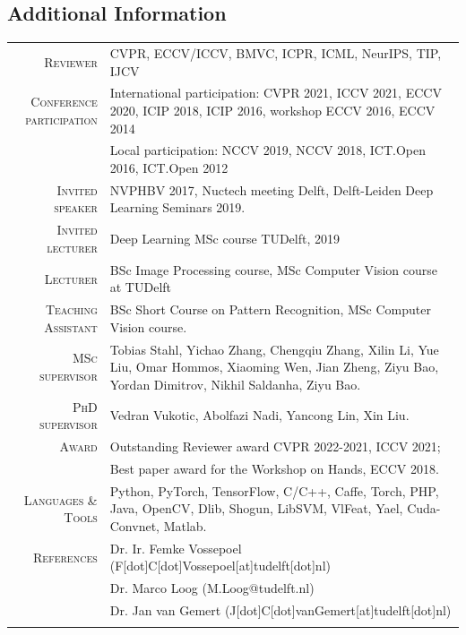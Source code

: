\documentclass[a4paper, oneside, final]{scrartcl}
\begin{document}
\begin{center}
		\section{Additional Information}
		\begin{tabular}{r@{\hskip 0.3in}p{11.3cm}}
            \textsc{Reviewer}                   & CVPR, ECCV/ICCV, BMVC, ICPR, ICML, NeurIPS, TIP, IJCV\\
            \textsc{Conference participation}   & International participation: CVPR 2021, ICCV 2021, ECCV 2020, ICIP 2018, ICIP 2016, workshop ECCV 2016, ECCV 2014\\
                                                & Local participation: NCCV 2019, NCCV 2018, ICT.Open 2016, ICT.Open 2012\\
            \textsc{Invited speaker}            & NVPHBV 2017, Nuctech meeting Delft, Delft-Leiden Deep Learning Seminars 2019.\\
            \textsc{Invited lecturer}           & Deep Learning MSc course TUDelft, 2019\\
			\textsc{Lecturer}		            & BSc Image Processing course, MSc Computer Vision course at TUDelft\\
            \textsc{Teaching Assistant}         & BSc Short Course on Pattern Recognition, MSc Computer Vision course.\\ 
			\textsc{MSc supervisor}             & Tobias Stahl, Yichao Zhang, Chengqiu Zhang, Xilin Li, Yue Liu, Omar Hommos, Xiaoming Wen, Jian Zheng, Ziyu Bao, Yordan Dimitrov, Nikhil Saldanha, Ziyu Bao.\\
			\textsc{PhD supervisor}             & Vedran Vukotic, Abolfazi Nadi, Yancong Lin, Xin Liu.\\[5px] 
            \textsc{Award}                      & Outstanding Reviewer award CVPR 2022-2021, ICCV 2021;\\ 
                                                & Best paper award for the Workshop on Hands, ECCV 2018.\\  
			\textsc{Languages \& Tools}         & Python, PyTorch, TensorFlow, C\slash C++, Caffe, Torch, PHP, 
                                                Java, OpenCV, Dlib, Shogun, LibSVM, VlFeat, Yael, Cuda-Convnet, Matlab.\\

			\textsc{References} & Dr. Ir. Femke Vossepoel (F[dot]C[dot]Vossepoel[at]tudelft[dot]nl)\\
                                & Dr. Marco Loog (M.Loog@tudelft.nl)\\
                                & Dr. Jan van Gemert (J[dot]C[dot]vanGemert[at]tudelft[dot]nl)\\
			\multicolumn{2}{c}{}\\
		\end{tabular}
	\end{center}
\end{document}
